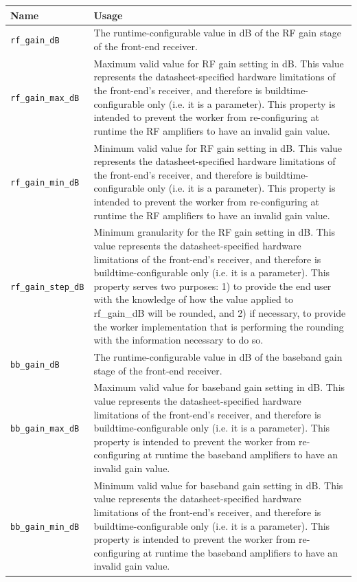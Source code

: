    \begin{longtable}{|p{5cm}|p{12cm}|}
			\hline
			\rowcolor{blue}
			Name                                & Usage                                                                                      \\
			\hline
			\verb+rf_gain_dB+                   & The runtime-configurable value in dB of the RF gain stage of the front-end receiver.        \\
			\hline
			\verb+rf_gain_max_dB+               & Maximum valid value for RF gain setting in dB. This value represents the datasheet-specified hardware limitations of the front-end's receiver, and therefore is buildtime-configurable only (i.e. it is a parameter). This property is intended to prevent the worker from re-configuring at runtime the RF amplifiers to have an invalid gain value. \\
			\hline
			\verb+rf_gain_min_dB+               & Minimum valid value for RF gain setting in dB. This value represents the datasheet-specified hardware limitations of the front-end's receiver, and therefore is buildtime-configurable only (i.e. it is a parameter). This property is intended to prevent the worker from re-configuring at runtime the RF amplifiers to have an invalid gain value. \\
			\hline
			\verb+rf_gain_step_dB+              & Minimum granularity for the RF gain setting in dB. This value represents the datasheet-specified hardware limitations of the front-end's receiver, and therefore is buildtime-configurable only (i.e. it is a parameter). This property serves two purposes: 1) to provide the end user with the knowledge of how the value applied to rf\_gain\_dB will be rounded, and 2) if necessary, to provide the worker implementation that is performing the rounding with the information necessary to do so. \\
			\hline
			\verb+bb_gain_dB+                   & The runtime-configurable value in dB of the baseband gain stage of the front-end receiver.  \\
			\hline
			\verb+bb_gain_max_dB+               & Maximum valid value for baseband gain setting in dB. This value represents the datasheet-specified hardware limitations of the front-end's receiver, and therefore is buildtime-configurable only (i.e. it is a parameter). This property is intended to prevent the worker from re-configuring at runtime the baseband amplifiers to have an invalid gain value. \\
			\hline
			\verb+bb_gain_min_dB+               & Minimum valid value for baseband gain setting in dB. This value represents the datasheet-specified hardware limitations of the front-end's receiver, and therefore is buildtime-configurable only (i.e. it is a parameter). This property is intended to prevent the worker from re-configuring at runtime the baseband amplifiers to have an invalid gain value. \\

\end{longtable}
